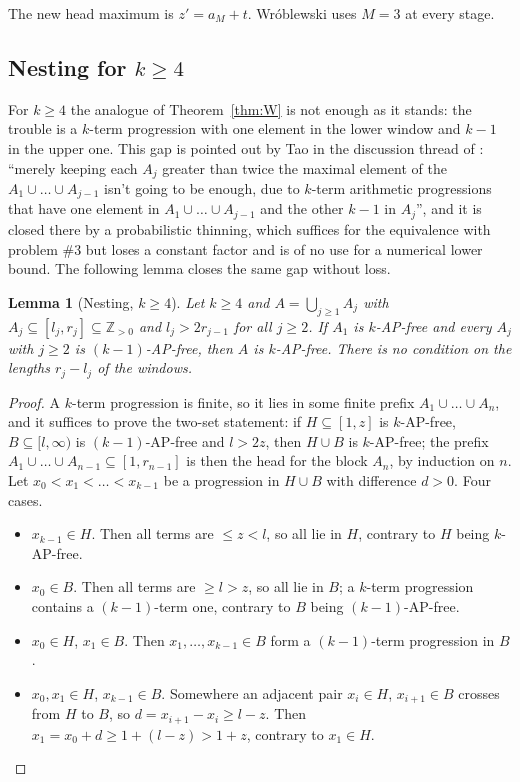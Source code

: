 \documentclass[11pt,a4paper]{article}
\newtheorem{lemma}[theorem]{Lemma}
\theoremstyle{definition}
\theoremstyle{remark}
\newcommand{\Z}{\mathbb{Z}}
\begin{document}
The new head maximum is $z' = a_M + t$. Wr\'oblewski uses $M=3$ at every stage.

\subsection{Nesting for \texorpdfstring{$k \ge 4$}{k >= 4}}\label{sec:nesting}

For $k \ge 4$ the analogue of Theorem~\ref{thm:W} is not enough as it stands: the trouble is a $k$-term progression with one element in the lower window and $k-1$ in the upper one. This gap is pointed out by Tao in the discussion thread of \cite{EP169} \cite{Tao25}: ``merely keeping each $A_j$ greater than twice the maximal element of the $A_1 \cup \dots \cup A_{j-1}$ isn't going to be enough, due to $k$-term arithmetic progressions that have one element in $A_1 \cup \dots \cup A_{j-1}$ and the other $k-1$ in $A_j$'', and it is closed there by a probabilistic thinning, which suffices for the equivalence with problem \#3 but loses a constant factor and is of no use for a numerical lower bound. The following lemma closes the same gap without loss.

\begin{lemma}[Nesting, $k \ge 4$]\label{lem:nest}
Let $k \ge 4$ and $A = \bigcup_{j \ge 1} A_j$ with $A_j \subseteq [l_j, r_j] \subseteq \Z_{>0}$ and $l_{j} > 2 r_{j-1}$ for all $j \ge 2$. If $A_1$ is $k$-AP-free and every $A_j$ with $j \ge 2$ is $(k-1)$-AP-free, then $A$ is $k$-AP-free. There is no condition on the lengths $r_j - l_j$ of the windows.
\end{lemma}

\begin{proof}
A $k$-term progression is finite, so it lies in some finite prefix $A_1 \cup \dots \cup A_n$, and it suffices to prove the two-set statement: if $H \subseteq [1,z]$ is $k$-AP-free, $B \subseteq [l,\infty)$ is $(k-1)$-AP-free and $l > 2z$, then $H \cup B$ is $k$-AP-free; the prefix $A_1 \cup \dots \cup A_{n-1} \subseteq [1, r_{n-1}]$ is then the head for the block $A_n$, by induction on $n$. Let $x_0 < x_1 < \dots < x_{k-1}$ be a progression in $H \cup B$ with difference $d > 0$. Four cases.
\begin{itemize}
\item $x_{k-1} \in H$. Then all terms are $\le z < l$, so all lie in $H$, contrary to $H$ being $k$-AP-free.
\item $x_0 \in B$. Then all terms are $\ge l > z$, so all lie in $B$; a $k$-term progression contains a $(k-1)$-term one, contrary to $B$ being $(k-1)$-AP-free.
\item $x_0 \in H$, $x_1 \in B$. Then $x_1, \dots, x_{k-1} \in B$ form a $(k-1)$-term progression in $B$.
\item $x_0, x_1 \in H$, $x_{k-1} \in B$. Somewhere an adjacent pair $x_i \in H$, $x_{i+1} \in B$ crosses from $H$ to $B$, so $d = x_{i+1} - x_i \ge l - z$. Then $x_1 = x_0 + d \ge 1 + (l - z) > 1 + z$, contrary to $x_1 \in H$. \qedhere
\end{itemize}
\end{proof}
\end{document}
